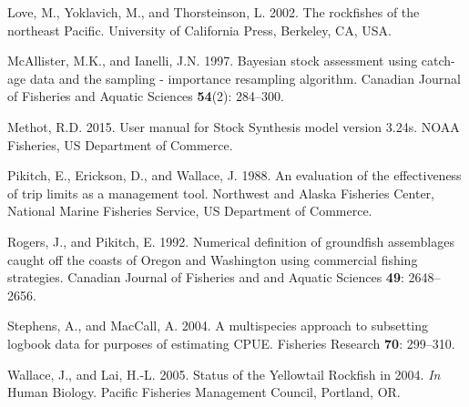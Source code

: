 \documentclass[12pt,]{article}
\begin{document}
\hypertarget{ref-Love2002}{}
Love, M., Yoklavich, M., and Thorsteinson, L. 2002. The rockfishes of
the northeast Pacific. University of California Press, Berkeley, CA,
USA.

\hypertarget{ref-McAllister1997}{}
McAllister, M.K., and Ianelli, J.N. 1997. Bayesian stock assessment
using catch-age data and the sampling - importance resampling algorithm.
Canadian Journal of Fisheries and Aquatic Sciences \textbf{54}(2):
284--300.

\hypertarget{ref-Methot2015}{}
Methot, R.D. 2015. User manual for Stock Synthesis model version 3.24s.
NOAA Fisheries, US Department of Commerce.

\hypertarget{ref-Pikitch1988}{}
Pikitch, E., Erickson, D., and Wallace, J. 1988. An evaluation of the
effectiveness of trip limits as a management tool. Northwest and Alaska
Fisheries Center, National Marine Fisheries Service, US Department of
Commerce.

\hypertarget{ref-Rogers1992}{}
Rogers, J., and Pikitch, E. 1992. Numerical definition of groundfish
assemblages caught off the coasts of Oregon and Washington using
commercial fishing strategies. Canadian Journal of Fisheries and and
Aquatic Sciences \textbf{49}: 2648--2656.

\hypertarget{ref-Stephens2004}{}
Stephens, A., and MacCall, A. 2004. A multispecies approach to
subsetting logbook data for purposes of estimating CPUE. Fisheries
Research \textbf{70}: 299--310.

\hypertarget{ref-Wallace2005}{}
Wallace, J., and Lai, H.-L. 2005. Status of the Yellowtail Rockfish in
2004. \emph{In} Human Biology. Pacific Fisheries Management Council,
Portland, OR.
\end{document}
